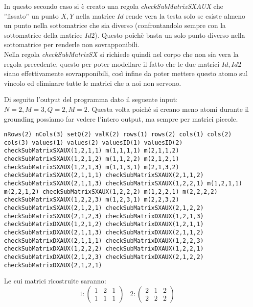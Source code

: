 \documentclass{article}
\begin{document}
In questo secondo caso si è creato una regola \textit{checkSubMatrixSXAUX} che ''fissato'' un punto $X,Y$ nella matrice $Id$ rende vera la testa solo se esiste almeno un punto nella sottomatrice che sia diverso (confrontandolo sempre con la sottomatrice della matrice $Id2$). Questo poichè basta un solo punto diverso nella sottomatrice per renderle non sovrapponibili.\\

Nella regola \textit{checkSubMatrixSX} si richiede quindi nel corpo che non sia vera la regola precedente, questo per poter modellare il fatto che le due matrici $Id, Id2$ siano effettivamente sovrapponibili, così infine da poter mettere questo atomo sul vincolo ed eliminare tutte le matrici che a noi non servono.

Di seguito l'output del programma dato il seguente input: $N=2, M=3, Q=2, M=2$. Questa volta poichè si creano meno atomi durante il grounding possiamo far vedere l'intero output, ma sempre per matrici piccole.

\begin{lstlisting}
nRows(2) nCols(3) setQ(2) valK(2) rows(1) rows(2) cols(1) cols(2) cols(3) values(1) values(2) valuesID(1) valuesID(2) checkSubMatrixSXAUX(1,2,1,1) m(1,1,1,1) m(2,1,1,2) checkSubMatrixSXAUX(1,2,1,2) m(1,1,2,2) m(2,1,2,1) checkSubMatrixSXAUX(1,2,1,3) m(1,1,3,1) m(2,1,3,2) checkSubMatrixSXAUX(2,1,1,1) checkSubMatrixSXAUX(2,1,1,2) checkSubMatrixSXAUX(2,1,1,3) checkSubMatrixSXAUX(1,2,2,1) m(1,2,1,1) m(2,2,1,2) checkSubMatrixSXAUX(1,2,2,2) m(1,2,2,1) m(2,2,2,2) checkSubMatrixSXAUX(1,2,2,3) m(1,2,3,1) m(2,2,3,2) checkSubMatrixSXAUX(2,1,2,1) checkSubMatrixSXAUX(2,1,2,2) checkSubMatrixSXAUX(2,1,2,3) checkSubMatrixDXAUX(1,2,1,3) checkSubMatrixDXAUX(1,2,1,2) checkSubMatrixDXAUX(1,2,1,1) checkSubMatrixDXAUX(2,1,1,3) checkSubMatrixDXAUX(2,1,1,2) checkSubMatrixDXAUX(2,1,1,1) checkSubMatrixDXAUX(1,2,2,3) checkSubMatrixDXAUX(1,2,2,2) checkSubMatrixDXAUX(1,2,2,1) checkSubMatrixDXAUX(2,1,2,3) checkSubMatrixDXAUX(2,1,2,2) checkSubMatrixDXAUX(2,1,2,1)
\end{lstlisting}

Le cui matrici ricostruite saranno:\\
$$
1 : 
\left(\begin{array}{ccc}
1 & 2 & 1 \\
1 & 1 & 1
\end{array}\right)
\;\;\;
2 : 
\left(\begin{array}{cccc}
2 & 1 & 2 \\
2 & 2 & 2
\end{array}\right)
$$
\end{document}

